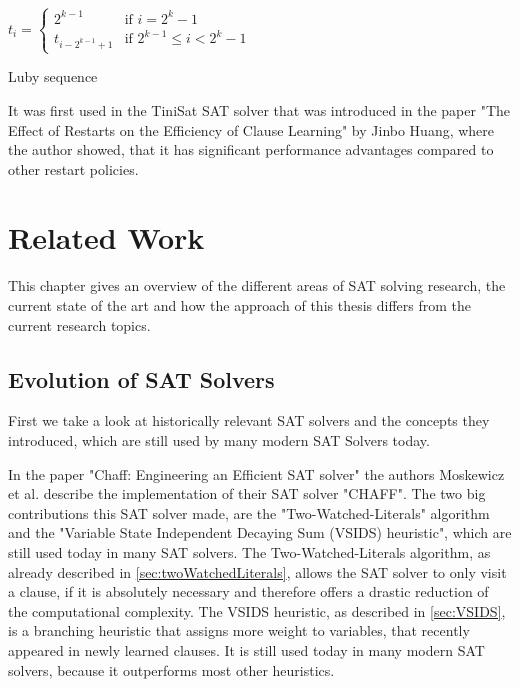 \begin{definition}
\centering
\begin{leftbar}
$t_i =
\begin{cases}
  2^{k-1} & \text{if } i = 2^k - 1   \\
  t_{i-2^{k-1}+1} & \text{if } 2^{k-1} \leq i < 2^k - 1
\end{cases}$
\end{leftbar}
\caption{Luby sequence \cite{luby1993optimal}}
\end{definition}

It was first used in the TiniSat SAT solver that was introduced in the paper "The Effect of Restarts on the Efficiency of Clause Learning" \cite{huang2007effect} by Jinbo Huang, where the author showed, that it has significant performance advantages compared to other restart policies.

\chapter{Related Work}
\label{ch:Related Work}

This chapter gives an overview of the different areas of SAT solving research, the current state of the art and how the approach of this thesis differs from the current research topics.

\section{Evolution of SAT Solvers}
First we take a look at historically relevant SAT solvers and the concepts they introduced, which are still used by many modern SAT Solvers today.

In the paper "Chaff: Engineering an Efficient SAT solver" \cite{moskewicz2001chaff} the authors Moskewicz et al. describe the implementation of their SAT solver "CHAFF". The two big contributions this SAT solver made, are the "Two-Watched-Literals" algorithm and the "Variable State Independent Decaying Sum (VSIDS) heuristic", which are still used today in many SAT solvers. The Two-Watched-Literals algorithm, as already described in \ref{sec:twoWatchedLiterals}, allows the SAT solver to only visit a clause, if it is absolutely necessary and therefore offers a drastic reduction of the computational complexity. The VSIDS heuristic, as described in \ref{sec:VSIDS}, is a branching heuristic that assigns more weight to variables, that recently appeared in newly learned clauses. It is still used today in many modern SAT solvers, because it outperforms most other heuristics.

